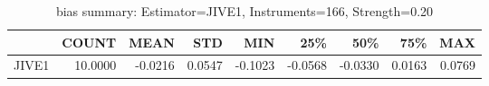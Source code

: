\begin{table}[ht]
\centering
\caption{bias summary: Estimator=JIVE1, Instruments=166, Strength=0.20}
\begin{tabular}{lrrrrrrrr}
\toprule
 & COUNT & MEAN & STD & MIN & 25\% & 50\% & 75\% & MAX \\
\midrule
JIVE1 & 10.0000 & -0.0216 & 0.0547 & -0.1023 & -0.0568 & -0.0330 & 0.0163 & 0.0769 \\
\bottomrule
\end{tabular}
\end{table}
